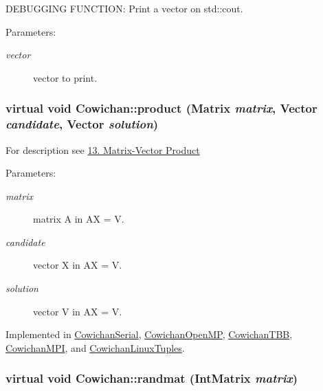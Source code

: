 DEBUGGING FUNCTION: Print a vector on std::cout. \begin{Desc}
\item[Parameters:]
\begin{description}
\item[{\em vector}]vector to print. \end{description}
\end{Desc}
\hypertarget{class_cowichan_3d7d4b581a1d6f0392dc452830fb3b03}{
\subsubsection[{product}]{\setlength{\rightskip}{0pt plus 5cm}virtual void Cowichan::product ({\bf Matrix} {\em matrix}, \/  {\bf Vector} {\em candidate}, \/  {\bf Vector} {\em solution})}}
\label{class_cowichan_3d7d4b581a1d6f0392dc452830fb3b03}


For description see \hyperlink{index_product_sec}{13. Matrix-Vector Product} \begin{Desc}
\item[Parameters:]
\begin{description}
\item[{\em matrix}]matrix A in AX = V. \item[{\em candidate}]vector X in AX = V. \item[{\em solution}]vector V in AX = V. \end{description}
\end{Desc}


Implemented in \hyperlink{class_cowichan_serial_00411b35445d7d3038b96d53e43bdffa}{CowichanSerial}, \hyperlink{class_cowichan_open_m_p_41d0067382570d1e784f62f2c5963d49}{CowichanOpenMP}, \hyperlink{class_cowichan_t_b_b_f3144458520e2dff1f9fad5753f6fc3d}{CowichanTBB}, \hyperlink{class_cowichan_m_p_i_1b7dccf774caccb26839cd29fe0a5cb0}{CowichanMPI}, and \hyperlink{class_cowichan_linux_tuples_c4874f09c54056ac94d00f9e341a94f4}{CowichanLinuxTuples}.\hypertarget{class_cowichan_c44cacf9d9e363a5b076bcee8b9a7a73}{
\subsubsection[{randmat}]{\setlength{\rightskip}{0pt plus 5cm}virtual void Cowichan::randmat ({\bf IntMatrix} {\em matrix})}}
\label{class_cowichan_c44cacf9d9e363a5b076bcee8b9a7a73}


